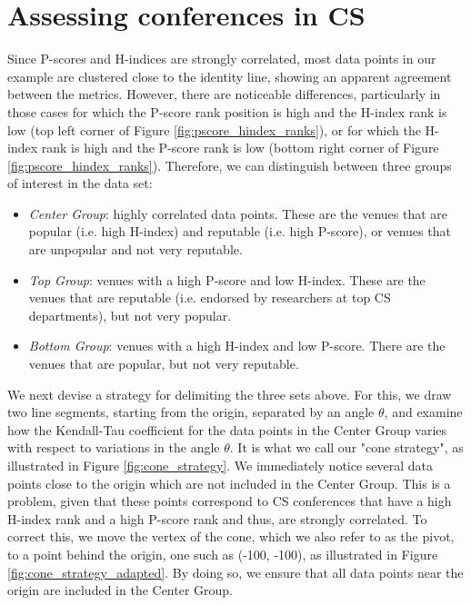 \documentclass[man,floatsintext]{apa6}
\begin{document}
\section{Assessing conferences in CS}
\label{sec:notifications}

Since P-scores and H-indices are strongly correlated, most data points in our example are clustered close to the identity 
line, showing an apparent agreement between the metrics. However, there are noticeable differences, 
particularly in those cases for which the P-score rank position is high and the H-index rank is low 
(top left corner of Figure \ref{fig:pscore_hindex_ranks}), or for which the H-index rank is high and the 
P-score rank is low (bottom right corner of Figure \ref{fig:pscore_hindex_ranks}). Therefore, we 
can distinguish between three groups of interest in the data set:

\begin{itemize}
\item \textit{Center Group}: highly correlated data points. These are the venues that are popular (i.e. high H-index) and reputable (i.e. high P-score), or venues that are unpopular and not very reputable.
\item \textit{Top Group}: venues with a high P-score and low H-index. These are the venues that are reputable (i.e. endorsed by researchers at top CS departments), but not very popular.
\item \textit{Bottom Group}: venues with a high H-index and low P-score. There are the venues that are popular, but not very reputable.

\end{itemize}

We next devise a strategy for delimiting the three sets
above. For this, we draw two line segments, starting from
the origin, separated by an angle $ \theta $, and examine
how the Kendall-Tau coefficient for the data points in the Center Group varies with respect to variations in the angle $ \theta $. It is what we call our "cone strategy", as illustrated in Figure \ref{fig:cone_strategy}. We immediately notice several data points close to the origin
which are not included in the Center Group. This is a problem, given that these points correspond to CS conferences that have a high H-index rank and a high
P-score rank and thus, are strongly correlated. To
correct this, we move the vertex of the cone, which we also
refer to as the pivot, to a point behind the origin, one
such as (-100, -100), as illustrated in Figure \ref{fig:cone_strategy_adapted}. By doing so, we ensure that all data points near the origin are included in the
Center Group.
\end{document}
